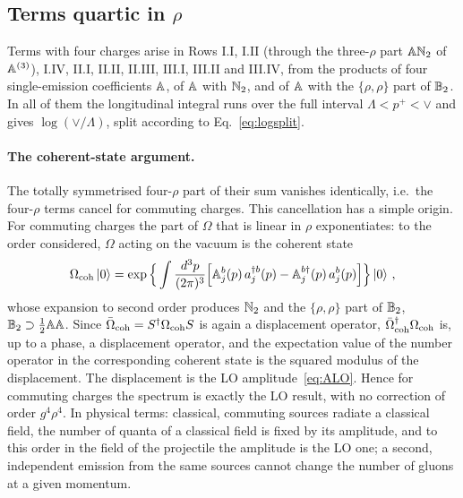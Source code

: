 \subsection{Terms quartic in \texorpdfstring{$\rho$}{rho}}\label{sec:fourrho}

Terms with four charges arise in Rows I.I, I.II (through the three-$\rho$ part $\mathbb{A}\mathbb{N}_2$ of $\mathbb{A}^{(3)}$), I.IV, II.I, II.II, II.III, III.I, III.II and III.IV, from the products of four single-emission coefficients $\mathbb{A}$, of $\mathbb{A}$ with $\mathbb{N}_2$, and of $\mathbb{A}$ with the $\{\rho,\rho\}$ part of $\mathbb{B}_2$. In all of them the longitudinal integral runs over the full interval $\Lambda<p^+<\vee$ and gives $\log(\vee/\Lambda)$, split according to Eq.~\eqref{eq:logsplit}.

\paragraph{The coherent-state argument.} The totally symmetrised four-$\rho$ part of their sum vanishes identically, i.e.\ the four-$\rho$ terms cancel for commuting charges. This cancellation has a simple origin. For commuting charges the part of $\Omega$ that is linear in $\rho$ exponentiates: to the order considered, $\Omega$ acting on the vacuum is the coherent state
\begin{align}\label{eq:coherent}
\Omega_{\rm coh}\ket0=\exp\Big\{\int\frac{d^3p}{(2\pi)^3}\Big[\mathbb{A}^b_j(p)\,a^{\dagger b}_j(p)-\mathbb{A}^{b\dagger}_j(p)\,a^b_j(p)\Big]\Big\}\ket0\,,
\end{align}
whose expansion to second order produces $\mathbb{N}_2$ and the $\{\rho,\rho\}$ part of $\mathbb{B}_2$, $\mathbb{B}_2\supset\frac12\mathbb{A}\mathbb{A}$. Since $\bar\Omega_{\rm coh}=S^\dagger\Omega_{\rm coh}S$ is again a displacement operator, $\bar\Omega^\dagger_{\rm coh}\Omega_{\rm coh}$ is, up to a phase, a displacement operator, and the expectation value of the number operator in the corresponding coherent state is the squared modulus of the displacement. The displacement is the LO amplitude~\eqref{eq:ALO}. Hence for commuting charges the spectrum is exactly the LO result, with no correction of order $g^4\rho^4$. In physical terms: classical, commuting sources radiate a classical field, the number of quanta of a classical field is fixed by its amplitude, and to this order in the field of the projectile the amplitude is the LO one; a second, independent emission from the same sources cannot change the number of gluons at a given momentum.

